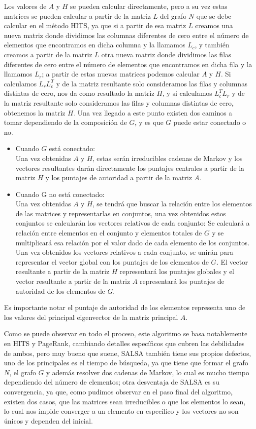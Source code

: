 \documentclass[11pt]{article}
\begin{document}
Los valores de $A$ y $H$ se pueden calcular directamente, pero a su vez estas matrices se pueden calcular a partir de la matriz $L$ del grafo $N$ que se debe calcular en el método HITS, ya que si a partir de esa matriz $L$ creamos una nueva matriz donde dividimos las columnas diferentes de cero entre el número de elementos que encontramos en dicha columna y la llamamos $L_c$, y también creamos a partir de la matriz $L$ otra nueva matriz donde dividimos las filas diferentes de cero entre el número de elementos que encontramos en dicha fila y la llamamos $L_r$; a partir de estas nuevas matrices podemos calcular $A$ y $H$. Si calculamos $L_rL_c^T$ y de la matriz resultante solo consideramos las filas y columnas distintas de cero, nos da como resultado la matriz $H$, y si calculamos $L_c^TL_r$ y de la matriz resultante solo consideramos las filas y columnas distintas de cero, obtenemos la matriz $H$. Una vez llegado a este punto existen dos caminos a tomar dependiendo de la composición de $G$, y es que $G$ puede estar conectado o no.
\begin{itemize}
    \item Cuando $G$ está conectado: \\
    Una vez obtenidas $A$ y $H$, estas serán irreducibles cadenas de Markov y los vectores resultantes darán directamente los puntajes centrales a partir de la matriz $H$ y los puntajes de autoridad a partir de la matriz $A$. \newpage
    \item Cuando G no está conectado: \\
    Una vez obtenidas $A$ y $H$, se tendrá que buscar la relación entre los elementos de las matrices y representarlas en conjuntos, una vez obtenidos estos conjuntos se calcularán los vectores relativos de cada conjunto: Se calculará a relación entre elementos en el conjunto y elementos totales de $G$ y se multiplicará esa relación por el valor dado de cada elemento de los conjuntos. Una vez obtenidos los vectores relativos a cada conjunto, se unirán para representar el vector global con los puntajes de los elementos de $G$. El vector resultante a partir de la matriz $H$ representará los puntajes globales y el vector resultante a partir de la matriz $A$ representará los puntajes de autoridad de los elementos de $G$.
\end{itemize}
Es importante notar el puntaje de autoridad de los elementos representa uno de los valores del principal eigenvector de la matriz principal $A$. \par \vspace{0.3cm}
Como se puede observar en todo el proceso, este algoritmo se basa notablemente en HITS y PageRank, cambiando detalles específicos que cubren las debilidades de ambos, pero muy bueno que suene, SALSA también tiene sus propios defectos, uno de los principales es el tiempo de búsqueda, ya que tiene que formar el grafo $N$, el grafo $G$ y además resolver dos cadenas de Markov, lo cual es mucho tiempo dependiendo del número de elementos; otra desventaja de SALSA es su convergencia, ya que, como pudimos observar en el paso final del algoritmo, existen dos casos, que las matrices sean irreducibles o que los elementos lo sean, lo cual nos impide converger a un elemento en específico y los vectores no son únicos y dependen del inicial. 
\end{document}
